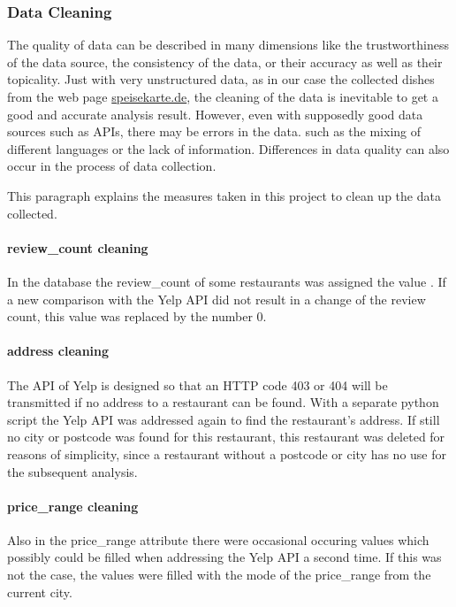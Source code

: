\subsubsection{Data Cleaning}
\label{subsubsec:cleaning}
The quality of data can be described in many dimensions like \zb{} the trustworthiness of the data source, the consistency of the data,
or their accuracy as well as their topicality.
Just with very unstructured data, as in our case the collected dishes from the web page \url{speisekarte.de}, the cleaning of the data is
inevitable to get a good and accurate analysis result.
However, even with supposedly good data sources such as \acp{API}, there may be errors in the data.
such as \zb{} the mixing of different languages or the lack of information.
Differences in data quality can also occur in the process of data collection.

This paragraph explains the measures taken in this project to clean up the data collected.

\paragraph{review\_count cleaning}
In the \pg{} database the review\_count of some restaurants was assigned the value .
If a new comparison with the Yelp \ac{API} did not result in a change of the review count,
this  value was replaced by the number 0.
\paragraph{address cleaning}
The \ac{API} of Yelp is designed so that an HTTP code 403 or 404 will be transmitted if no address to a restaurant
can be found.
With a separate python script the Yelp \ac{API} was addressed again to find the restaurant's address.
If still no city or postcode was found for this restaurant, this restaurant was deleted for reasons of simplicity,
since a restaurant without a postcode or city has no use for the subsequent analysis.
\paragraph{price\_range cleaning}
Also in the price\_range attribute there were occasional occuring  values which possibly could be filled when addressing the Yelp \ac{API} a second time.
If this was not the case, the  values were filled with the mode of the price\_range from the current city.
